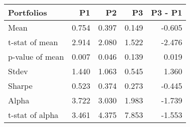 \begin{tabular}{lrrrr}
\toprule
Portfolios & P1 & P2 & P3 & P3 - P1 \\
\midrule
Mean & 0.754 & 0.397 & 0.149 & -0.605 \\
t-stat of mean & 2.914 & 2.080 & 1.522 & -2.476 \\
p-value of mean & 0.007 & 0.046 & 0.139 & 0.019 \\
Stdev & 1.440 & 1.063 & 0.545 & 1.360 \\
Sharpe & 0.523 & 0.374 & 0.273 & -0.445 \\
Alpha & 3.722 & 3.030 & 1.983 & -1.739 \\
t-stat of alpha & 3.461 & 4.375 & 7.853 & -1.553 \\
\bottomrule
\end{tabular}

